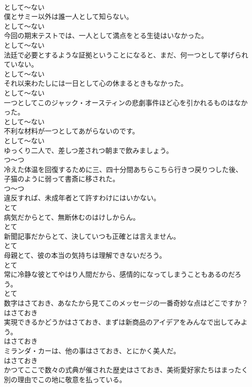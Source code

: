 \documentclass[8pt]{extreport}
\begin{document}
\begin{CJK}{UTF8}{min}
\\	として～ない	
\\	僕とサミー以外は誰一人として知らない。	
\\	として～ない	
\\	今回の期末テストでは、一人として満点をとる生徒はいなかった。	
\\	として～ない	
\\	法廷で必要とするような証拠ということになると、まだ、何一つとして挙げられていない。	
\\	として～ない	
\\	それ以来わたしには一日として心の休まるときもなかった。	
\\	として～ない	
\\	一つとしてこのジャック・オースティンの悲劇事件ほど心を引かれるものはなかった。	
\\	として～ない	
\\	不利な材料が一つとしてあがらないのです。	
\\	として～ない	
\\	ゆっくり二人で、差しつ差されつ朝まで飲みましょう。	
\\	つ～つ	
\\	冷えた体温を回復するために三、四十分間あちらこちら行きつ戻りつした後、子猫のように弱って書斎に移された。	
\\	つ～つ	
\\	違反すれば、未成年者とて許すわけにはいかない。	
\\	とて	
\\	病気だからとて、無断休むのはけしからん。	
\\	とて	
\\	新聞記事だからとて、決していつも正確とは言えません。	
\\	とて	
\\	母親とて、彼の本当の気持ちは理解できないだろう。	
\\	とて	
\\	常に冷静な彼とてやはり人間だから、感情的になってしまうこともあるのだろう。	
\\	とて	
\\	数字はさておき、あなたから見てこのメッセージの一番奇妙な点はどこですか？	
\\	はさておき	
\\	実現できるかどうかはさておき、まずは新商品のアイデアをみんなで出してみよう。	
\\	はさておき	
\\	ミランダ・カーは、他の事はさておき、とにかく美人だ。	
\\	はさておき	
\\	かつてここで数々の式典が催された歴史はさておき、美術愛好家たちはまったく別の理由でこの地に敬意を払っている。	

\end{CJK}
\end{document}
